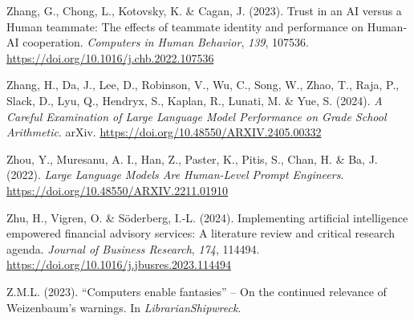 \documentclass[
  letterpaper,
  DIV=11,
  numbers=noendperiod]{scrartcl}
\newlength{\cslhangindent}
\newenvironment{CSLReferences}[2] %
 {\begin{list}{}{%
  \setlength{\itemindent}{0pt}
  \setlength{\leftmargin}{0pt}
  \setlength{\parsep}{0pt}
  \ifodd #1
   \setlength{\leftmargin}{\cslhangindent}
   \setlength{\itemindent}{-1\cslhangindent}
  \fi
  \setlength{\itemsep}{#2\baselineskip}}}
 {\end{list}}
\begin{document}
\begin{CSLReferences}{1}{0}
Zhang, G., Chong, L., Kotovsky, K. \& Cagan, J. (2023). Trust in an {AI}
versus a {Human} teammate: {The} effects of teammate identity and
performance on {Human-AI} cooperation. \emph{Computers in Human
Behavior}, \emph{139}, 107536.
\url{https://doi.org/10.1016/j.chb.2022.107536}

Zhang, H., Da, J., Lee, D., Robinson, V., Wu, C., Song, W., Zhao, T.,
Raja, P., Slack, D., Lyu, Q., Hendryx, S., Kaplan, R., Lunati, M. \&
Yue, S. (2024). \emph{A {Careful Examination} of {Large Language Model
Performance} on {Grade School Arithmetic}}. arXiv.
\url{https://doi.org/10.48550/ARXIV.2405.00332}

Zhou, Y., Muresanu, A. I., Han, Z., Paster, K., Pitis, S., Chan, H. \&
Ba, J. (2022). \emph{Large {Language Models Are Human-Level Prompt
Engineers}}. \url{https://doi.org/10.48550/ARXIV.2211.01910}

Zhu, H., Vigren, O. \& Söderberg, I.-L. (2024). Implementing artificial
intelligence empowered financial advisory services: {A} literature
review and critical research agenda. \emph{Journal of Business
Research}, \emph{174}, 114494.
\url{https://doi.org/10.1016/j.jbusres.2023.114494}

Z.M.L. (2023). {``{Computers} enable fantasies''} -- {On} the continued
relevance of {Weizenbaum}'s warnings. In \emph{LibrarianShipwreck}.

\end{CSLReferences}
\end{document}
